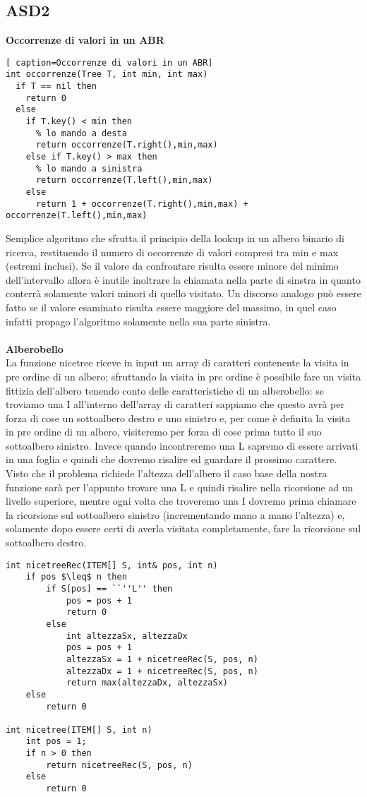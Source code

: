 \documentclass[../cheatSheetAlgoritmi.tex]{subfiles}
\begin{document}
\subsection{ASD2}
\textbf{Occorrenze di valori in un ABR}
\begin{lstlisting}[ caption=Occorrenze di valori in un ABR]
int occorrenze(Tree T, int min, int max)
  if T == nil then
    return 0
  else
    if T.key() < min then 
      % lo mando a desta
      return occorrenze(T.right(),min,max)
    else if T.key() > max then 
      % lo mando a sinistra
      return occorrenze(T.left(),min,max)
    else
      return 1 + occorrenze(T.right(),min,max) + occorrenze(T.left(),min,max)
\end{lstlisting}
Semplice algoritmo che sfrutta il principio della lookup in un albero binario di ricerca, restituendo il numero di occorrenze di valori compresi tra min e max (estremi inclusi). 
Se il valore da confrontare risulta essere minore del minimo dell'intervallo allora è inutile inoltrare la chiamata nella parte di sinstra in quanto conterrà solamente valori minori di quello visitato. Un discorso analogo può essere fatto se il valore esaminato risulta essere maggiore del massimo, in quel caso infatti propago l'algoritmo solamente nella sua parte sinistra.\\\\
\textbf{Alberobello}\\
La funzione nicetree riceve in input un array di caratteri contenente la visita in pre ordine di un albero; sfruttando la visita in pre ordine è possibile fare un visita fittizia dell'albero tenendo conto delle caratteristiche di un alberobello: se troviamo una I all'interno dell'array di caratteri sappiamo che questo avrà per forza di cose un sottoalbero destro e uno sinistro e, per come è definita la visita in pre ordine di un albero, visiteremo per forza di cose prima tutto il suo sottoalbero sinistro. Invece quando incontreremo una L sapremo di essere arrivati in una foglia e quindi che dovremo risalire ed guardare il prossimo carattere. Visto che il problema richiede l'altezza dell'albero il caso base della nostra funzione sarà per l'appunto trovare una L e quindi risalire nella ricorsione ad un livello superiore, mentre ogni volta che troveremo una I dovremo prima chiamare la ricorsione sul sottoalbero sinistro (incrementando mano a mano l'altezza) e, solamente dopo essere certi di averla visitata completamente, fare la ricorsione sul sottoalbero destro.
\newpage
\begin{lstlisting}[caption=Alberobello]
int nicetreeRec(ITEM[] S, int& pos, int n)
	if pos $\leq$ n then
    	if S[pos] == ``''L'' then
      		pos = pos + 1
      		return 0
    	else
      		int altezzaSx, altezzaDx
      		pos = pos + 1
      		altezzaSx = 1 + nicetreeRec(S, pos, n)
      		altezzaDx = 1 + nicetreeRec(S, pos, n)
      		return max(altezzaDx, altezzaSx)
  	else
    	return 0
    
int nicetree(ITEM[] S, int n)
	int pos = 1;
  	if n > 0 then
    	return nicetreeRec(S, pos, n)
  	else
    	return 0
\end{lstlisting}
\end{document}
